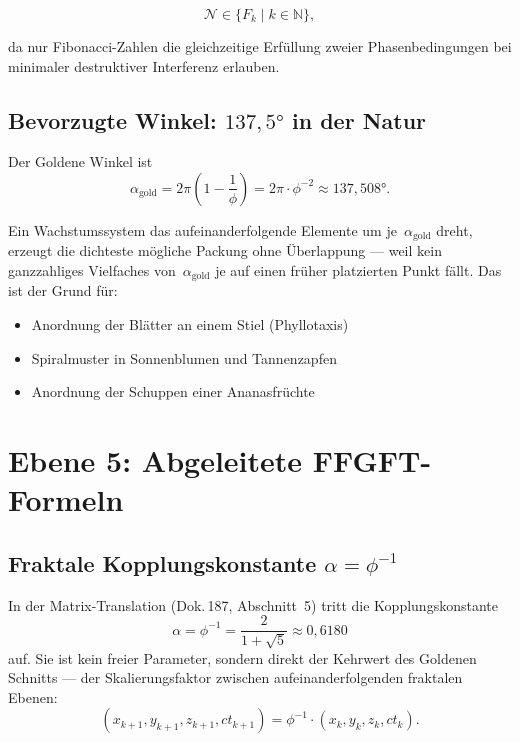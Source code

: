 \begin{equation}
  \mathcal{N} \in \{F_k \mid k \in \mathbb{N}\},
\end{equation}

da nur Fibonacci-Zahlen die gleichzeitige Erfüllung zweier
Phasenbedingungen bei minimaler destruktiver Interferenz erlauben.

\subsection{Bevorzugte Winkel: $137{,}5°$ in der Natur}

Der Goldene Winkel ist
\begin{equation}
  \alpha_{\text{gold}} = 2\pi \left(1 - \frac{1}{\phi}\right)
  = 2\pi \cdot \phi^{-2}
  \approx 137{,}508°.
\end{equation}

Ein Wachstumssystem das aufeinanderfolgende Elemente um je~$\alpha_{\text{gold}}$
dreht, erzeugt die dichteste mögliche Packung ohne Überlappung — weil
kein ganzzahliges Vielfaches von~$\alpha_{\text{gold}}$ je auf einen
früher platzierten Punkt fällt. Das ist der Grund für:
\begin{itemize}
  \item Anordnung der Blätter an einem Stiel (Phyllotaxis)
  \item Spiralmuster in Sonnenblumen und Tannenzapfen
  \item Anordnung der Schuppen einer Ananasfrüchte
\end{itemize}

\section{Ebene 5: Abgeleitete FFGFT-Formeln}

\subsection{Fraktale Kopplungskonstante $\alpha = \phi^{-1}$}

In der Matrix-Translation (Dok.\,187, Abschnitt~5) tritt die Kopplungskonstante
\begin{equation}
  \alpha = \phi^{-1} = \frac{2}{1+\sqrt{5}} \approx 0{,}6180
\end{equation}
auf. Sie ist kein freier Parameter, sondern direkt der Kehrwert des
Goldenen Schnitts — der Skalierungsfaktor zwischen aufeinanderfolgenden
fraktalen Ebenen:
\begin{equation}
  (x_{k+1}, y_{k+1}, z_{k+1}, ct_{k+1}) = \phi^{-1} \cdot
  (x_k, y_k, z_k, ct_k).
\end{equation}

